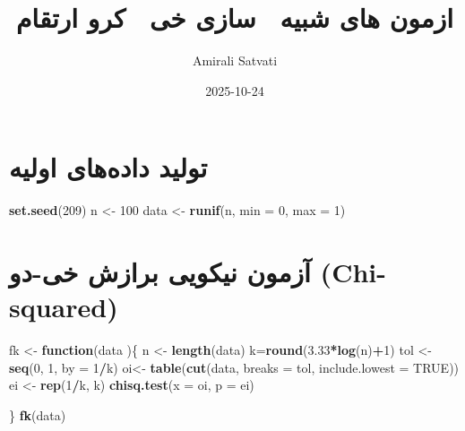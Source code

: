 \documentclass[
  persian,
]{article}
\title{ازمون های شبیه~ سازی خی~ کرو ارتقام}
\author{Amirali Satvati}
\date{2025-10-24}
\newenvironment{Shaded}{\begin{snugshade}}{\end{snugshade}}
\newcommand{\AttributeTok}[1]{\textcolor[rgb]{0.13,0.29,0.53}{#1}}
\newcommand{\ConstantTok}[1]{\textcolor[rgb]{0.56,0.35,0.01}{#1}}
\newcommand{\ControlFlowTok}[1]{\textcolor[rgb]{0.13,0.29,0.53}{\textbf{#1}}}
\newcommand{\DecValTok}[1]{\textcolor[rgb]{0.00,0.00,0.81}{#1}}
\newcommand{\FloatTok}[1]{\textcolor[rgb]{0.00,0.00,0.81}{#1}}
\newcommand{\FunctionTok}[1]{\textcolor[rgb]{0.13,0.29,0.53}{\textbf{#1}}}
\newcommand{\NormalTok}[1]{#1}
\newcommand{\OtherTok}[1]{\textcolor[rgb]{0.56,0.35,0.01}{#1}}
\newcommand{\SpecialCharTok}[1]{\textcolor[rgb]{0.81,0.36,0.00}{\textbf{#1}}}
\begin{document}
\maketitle

\section{تولید داده‌های
اولیه}\label{ux62aux648ux644ux6ccux62f-ux62fux627ux62fux647ux647ux627ux6cc-ux627ux648ux644ux6ccux647}

\latin

\begin{Shaded}
\begin{Highlighting}[]
\FunctionTok{set.seed}\NormalTok{(}\DecValTok{209}\NormalTok{)}
\NormalTok{n }\OtherTok{\textless{}{-}} \DecValTok{100}
\NormalTok{data }\OtherTok{\textless{}{-}} \FunctionTok{runif}\NormalTok{(n, }\AttributeTok{min =} \DecValTok{0}\NormalTok{, }\AttributeTok{max =} \DecValTok{1}\NormalTok{)}
\end{Highlighting}
\end{Shaded}

\persian

\section{آزمون نیکویی برازش خی-دو
(Chi-squared)}\label{ux622ux632ux645ux648ux646-ux646ux6ccux6a9ux648ux6ccux6cc-ux628ux631ux627ux632ux634-ux62eux6cc-ux62fux648-chi-squared}

\latin

\begin{Shaded}
\begin{Highlighting}[]
\NormalTok{fk }\OtherTok{\textless{}{-}} \ControlFlowTok{function}\NormalTok{(data )\{}
\NormalTok{  n }\OtherTok{\textless{}{-}} \FunctionTok{length}\NormalTok{(data)}
\NormalTok{  k}\OtherTok{=}\FunctionTok{round}\NormalTok{(}\FloatTok{3.33}\SpecialCharTok{*}\FunctionTok{log}\NormalTok{(n)}\SpecialCharTok{+}\DecValTok{1}\NormalTok{)}
\NormalTok{  tol }\OtherTok{\textless{}{-}} \FunctionTok{seq}\NormalTok{(}\DecValTok{0}\NormalTok{, }\DecValTok{1}\NormalTok{, }\AttributeTok{by =} \DecValTok{1}\SpecialCharTok{/}\NormalTok{k)}
\NormalTok{  oi}\OtherTok{\textless{}{-}} \FunctionTok{table}\NormalTok{(}\FunctionTok{cut}\NormalTok{(data, }\AttributeTok{breaks =}\NormalTok{ tol, }\AttributeTok{include.lowest =} \ConstantTok{TRUE}\NormalTok{))}
\NormalTok{  ei }\OtherTok{\textless{}{-}} \FunctionTok{rep}\NormalTok{(}\DecValTok{1}\SpecialCharTok{/}\NormalTok{k, k)}
  \FunctionTok{chisq.test}\NormalTok{(}\AttributeTok{x =}\NormalTok{ oi, }\AttributeTok{p =}\NormalTok{ ei)}
  
\NormalTok{\}}
\FunctionTok{fk}\NormalTok{(data)}
\end{Highlighting}
\end{Shaded}
\end{document}
